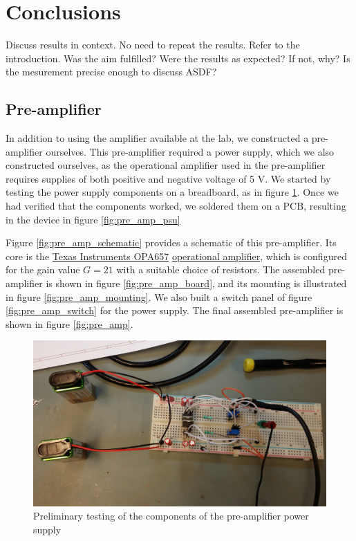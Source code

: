 \documentclass[a4paper]{article}
\begin{document}
\clearpage
\section{Conclusions}
\label{conclusions}
Discuss results in context.
No need to repeat the results.
Refer to the introduction.
Was the aim fulfilled?
Were the results as expected? If not, why?
Is the mesurement precise enough to discuss ASDF?


\clearpage
\begin{appendices}

\section{Pre-amplifier}
\label{pre_amp}
In addition to using the amplifier available at the lab, we constructed a pre-amplifier ourselves.
This pre-amplifier required a power supply, which we also constructed ourselves, as the operational amplifier used in the pre-amplifier requires supplies of both positive and negative voltage of 5 V.
We started by testing the power supply components on a breadboard, as in figure \ref{fig:pre_amp_psu_testing}.
Once we had verified that the components worked, we soldered them on a PCB, resulting in the device in figure \ref{fig:pre_amp_psu}

Figure \ref{fig:pre_amp_schematic} provides a schematic of this pre-amplifier.
Its core is the
\href{https://www.ti.com/product/OPA657}{Texas Instruments OPA657}
\href{https://en.wikipedia.org/wiki/Operational_amplifier}{operational amplifier}, which is configured for the gain value $G = 21$ with a suitable choice of resistors.
The assembled pre-amplifier is shown in figure \ref{fig:pre_amp_board}, and its mounting is illustrated in figure \ref{fig:pre_amp_mounting}.
We also built a switch panel of figure \ref{fig:pre_amp_switch} for the power supply.
The final assembled pre-amplifier is shown in figure \ref{fig:pre_amp}.


\begin{figure}[ht!]
\centering
\includegraphics[width=\textwidth]{fig/IMG_20201005_104331-cropped.jpg}
\caption{Preliminary testing of the components of the pre-amplifier power supply}
\label{fig:pre_amp_psu_testing}
\end{figure}


\end{appendices}
\end{document}
